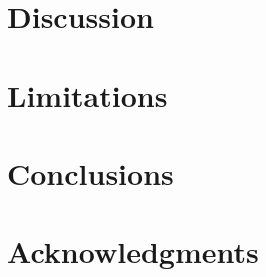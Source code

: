 \documentclass{sig-alternate}
\begin{document}
\section{Discussion}

\section{Limitations}                 
                 
\section{Conclusions}

\section{Acknowledgments}
%

%
%
\end{document}
